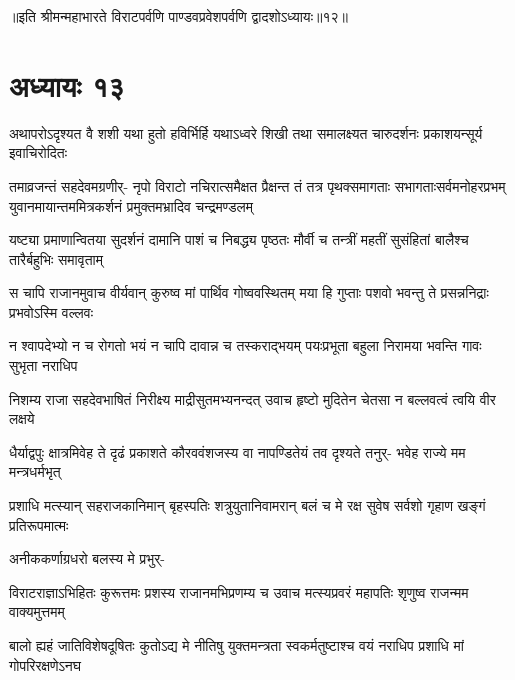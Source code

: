 ॥इति श्रीमन्महाभारते विराटपर्वणि पाण्डवप्रवेशपर्वणि द्वादशोऽध्यायः॥१२॥

\chapter{अध्यायः १३}

\fourlineindentedshloka
{अथापरोऽदृश्यत वै शशी यथा}
{हुतो हविर्भिर्हि यथाऽध्वरे शिखी}
{तथा समालक्ष्यत चारुदर्शनः}
{प्रकाशयन्सूर्य इवाचिरोदितः}


\sixlineindentedshloka
{तमाव्रजन्तं सहदेवमग्रणीर्-}
{नृपो विराटो नचिरात्समैक्षत}
{प्रैक्षन्त तं तत्र पृथक्समागताः}
{सभागताःसर्वमनोहरप्रभम्}
{युवानमायान्तममित्रकर्शनं}
{प्रमुक्तमभ्रादिव चन्द्रमण्डलम्}


\fourlineindentedshloka
{यष्ट्या प्रमाणान्वितया सुदर्शनं}
{दामानि पाशं च निबद्ध्य पृष्ठतः}
{मौर्वी च तन्त्रीं महतीं सुसंहितां}
{बालैश्च तारैर्बहुभिः समावृताम्}


\fourlineindentedshloka
{स चापि राजानमुवाच वीर्यवान्}
{कुरुष्व मां पार्थिव गोष्ववस्थितम्}
{मया हि गुप्ताः पशवो भवन्तु ते}
{प्रसन्ननिद्राः प्रभवोऽस्मि वल्लवः}


\fourlineindentedshloka
{न श्वापदेभ्यो न च रोगतो भयं}
{न चापि दावान्न च तस्कराद्भयम्}
{पयःप्रभूता बहुला निरामया}
{भवन्ति गावः सुभृता नराधिप}


\fourlineindentedshloka
{निशम्य राजा सहदेवभाषितं}
{निरीक्ष्य माद्रीसुतमभ्यनन्दत्}
{उवाच हृष्टो मुदितेन चेतसा}
{न बल्लवत्वं त्वयि वीर लक्षये}


\fourlineindentedshloka
{धैर्याद्वपुः क्षात्रमिवेह ते}
{दृढं प्रकाशते कौरववंशजस्य वा}
{नापण्डितेयं तव दृश्यते तनुर्-}
{भवेह राज्ये मम मन्त्रधर्मभृत्}


\fourlineindentedshloka
{प्रशाधि मत्स्यान् सहराजकानिमान्}
{बृहस्पतिः शत्रुयुतानिवामरान्}
{बलं च मे रक्ष सुवेष सर्वशो}
{गृहाण खङ्गं प्रतिरूपमात्मः}


{अनीककर्णाग्रधरो बलस्य मे प्रभुर्-\hspace{\shlokaspaceskip}}\\



\fourlineindentedshloka
{विराटराज्ञाऽभिहितः कुरूत्तमः}
{प्रशस्य राजानमभिप्रणम्य च}
{उवाच मत्स्यप्रवरं महापतिः}
{शृणुष्व राजन्मम वाक्यमुत्तमम्}


\fourlineindentedshloka
{बालो ह्यहं जातिविशेषदूषितः}
{कुतोऽद्य मे नीतिषु युक्तमन्त्रता}
{स्वकर्मतुष्टाश्च वयं नराधिप}
{प्रशाधि मां गोपरिरक्षणेऽनघ}


